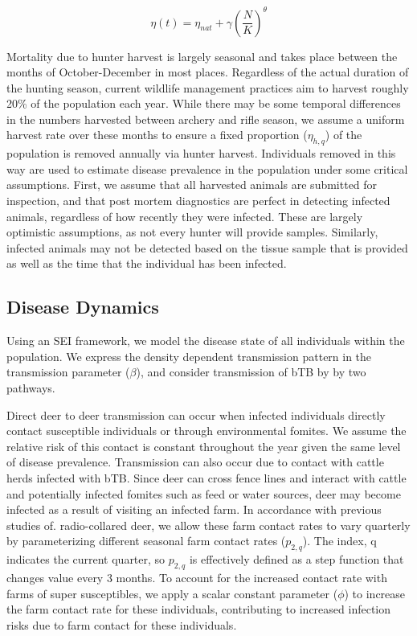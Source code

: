 \documentclass[number,preprint,review,12pt]{elsarticle}
\begin{document}
\begin{equation}
    \eta(t) = \eta_{nat} + \gamma\left(\frac{N}{K}\right)^{\theta}
    \label{MR}
\end{equation}

Mortality due to hunter harvest is largely seasonal and takes place between the months of October-December in most places. Regardless of the actual duration of the hunting season, current wildlife management practices aim to harvest roughly 20\% of the population each year\citep{Frawley2020}. While there may be some temporal differences in the numbers harvested between archery and rifle season, we assume a uniform harvest rate over these months to ensure a fixed proportion ($\eta_{h,q}$) of the population is removed annually via hunter harvest.  Individuals removed in this way are used to estimate disease prevalence in the population under some critical assumptions. First, we assume that all harvested animals are submitted for inspection, and that post mortem diagnostics are perfect in detecting infected animals, regardless of how recently they were infected. These are largely optimistic assumptions, as not every hunter will provide samples. Similarly, infected animals may not be detected based on the tissue sample that is provided as well as the time that the individual has been infected. 

\subsection{Disease Dynamics}
\doublespacing
Using an SEI framework, we model the disease state of all individuals within the population. We express the density dependent transmission pattern in the transmission parameter ($\beta$), and consider transmission of bTB by by two pathways. 

Direct deer to deer transmission can occur when infected individuals directly contact susceptible individuals or through environmental fomites. We assume the relative risk of this contact is constant throughout the year given the same level of disease prevalence. Transmission can also occur due to contact with cattle herds infected with bTB. Since deer can cross fence lines and interact with cattle and potentially infected fomites such as feed or water sources, deer may become infected as a result of visiting an infected farm. In accordance with previous studies of. radio-collared deer, we allow these farm contact rates to vary quarterly by parameterizing different seasonal farm contact rates ($p_{2,q}$). The index, q indicates the current quarter, so $p_{2,q}$ is effectively defined as a step function that changes value every 3 months.  To account for the increased contact rate with farms of super susceptibles, we apply a scalar constant parameter ($\phi$) to increase the farm contact rate for these individuals, contributing to increased infection risks due to farm contact for these individuals. 
\end{document}
